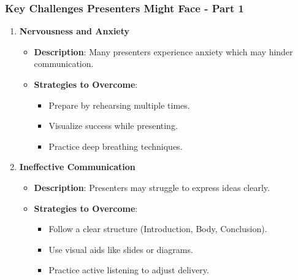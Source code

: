 \documentclass[aspectratio=169]{beamer}
\begin{document}
\begin{frame}[fragile]
    \frametitle{Key Challenges Presenters Might Face - Part 1}
    \begin{enumerate}
        \item \textbf{Nervousness and Anxiety}
            \begin{itemize}
                \item \textbf{Description}: Many presenters experience anxiety which may hinder communication.
                \item \textbf{Strategies to Overcome}:
                    \begin{itemize}
                        \item Prepare by rehearsing multiple times.
                        \item Visualize success while presenting.
                        \item Practice deep breathing techniques.
                    \end{itemize}
            \end{itemize}
        
        \item \textbf{Ineffective Communication}
            \begin{itemize}
                \item \textbf{Description}: Presenters may struggle to express ideas clearly.
                \item \textbf{Strategies to Overcome}:
                    \begin{itemize}
                        \item Follow a clear structure (Introduction, Body, Conclusion).
                        \item Use visual aids like slides or diagrams.
                        \item Practice active listening to adjust delivery.
                    \end{itemize}
            \end{itemize}
    \end{enumerate}
\end{frame}
\end{document}
